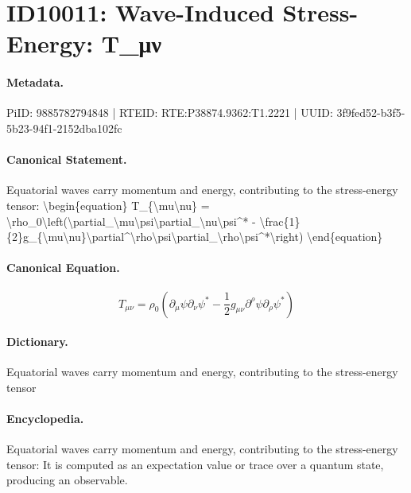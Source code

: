 \section*{ID10011: Wave-Induced Stress-Energy: T\_μν}
\paragraph{Metadata.}
PiID: 9885782794848 | RTEID: RTE:P38874.9362:T1.2221 | UUID: 3f9fed52-b3f5-5b23-94f1-2152dba102fc

\paragraph{Canonical Statement.}
Equatorial waves carry momentum and energy, contributing to the stress-energy tensor: \textbackslash{}begin\{equation\} T\_\{\textbackslash{}mu\textbackslash{}nu\} = \textbackslash{}rho\_0\textbackslash{}left(\textbackslash{}partial\_\textbackslash{}mu\textbackslash{}psi\textbackslash{}partial\_\textbackslash{}nu\textbackslash{}psi\textasciicircum{}* - \textbackslash{}frac\{1\}\{2\}g\_\{\textbackslash{}mu\textbackslash{}nu\}\textbackslash{}partial\textasciicircum{}\textbackslash{}rho\textbackslash{}psi\textbackslash{}partial\_\textbackslash{}rho\textbackslash{}psi\textasciicircum{}*\textbackslash{}right) \textbackslash{}end\{equation\}

\paragraph{Canonical Equation.}
\[
T_{\mu\nu} = \rho_0\left(\partial_\mu\psi\partial_\nu\psi^* - \frac{1}{2}g_{\mu\nu}\partial^\rho\psi\partial_\rho\psi^*\right)
\]

\paragraph{Dictionary.}
Equatorial waves carry momentum and energy, contributing to the stress-energy tensor

\paragraph{Encyclopedia.}
Equatorial waves carry momentum and energy, contributing to the stress-energy tensor: It is computed as an expectation value or trace over a quantum state, producing an observable.
